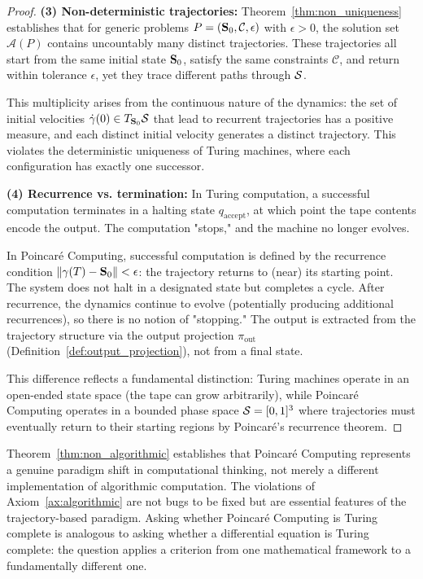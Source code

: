 \begin{proof}
\textbf{(3) Non-deterministic trajectories:} Theorem~\ref{thm:non_uniqueness} establishes that for generic problems $P = (\mathbf{S}_0, \mathcal{C}, \epsilon)$ with $\epsilon > 0$, the solution set $\mathcal{A}(P)$ contains uncountably many distinct trajectories. These trajectories all start from the same initial state $\mathbf{S}_0$, satisfy the same constraints $\mathcal{C}$, and return within tolerance $\epsilon$, yet they trace different paths through $\mathcal{S}$.

This multiplicity arises from the continuous nature of the dynamics: the set of initial velocities $\dot{\gamma}(0) \in T_{\mathbf{S}_0}\mathcal{S}$ that lead to recurrent trajectories has a positive measure, and each distinct initial velocity generates a distinct trajectory. This violates the deterministic uniqueness of Turing machines, where each configuration has exactly one successor.

\textbf{(4) Recurrence vs. termination:} In Turing computation, a successful computation terminates in a halting state $q_{\text{accept}}$, at which point the tape contents encode the output. The computation "stops," and the machine no longer evolves.

In Poincaré Computing, successful computation is defined by the recurrence condition $\|\gamma(T) - \mathbf{S}_0\| < \epsilon$: the trajectory returns to (near) its starting point. The system does not halt in a designated state but completes a cycle. After recurrence, the dynamics continue to evolve (potentially producing additional recurrences), so there is no notion of "stopping." The output is extracted from the trajectory structure via the output projection $\pi_{\text{out}}$ (Definition~\ref{def:output_projection}), not from a final state.

This difference reflects a fundamental distinction: Turing machines operate in an open-ended state space (the tape can grow arbitrarily), while Poincaré Computing operates in a bounded phase space $\mathcal{S} = [0,1]^3$ where trajectories must eventually return to their starting regions by Poincaré's recurrence theorem.
\end{proof}

\begin{remark}
\label{rem:paradigm_shift}
Theorem~\ref{thm:non_algorithmic} establishes that Poincaré Computing represents a genuine paradigm shift in computational thinking, not merely a different implementation of algorithmic computation. The violations of Axiom~\ref{ax:algorithmic} are not bugs to be fixed but are essential features of the trajectory-based paradigm. Asking whether Poincaré Computing is Turing complete is analogous to asking whether a differential equation is Turing complete: the question applies a criterion from one mathematical framework to a fundamentally different one.
\end{remark}

